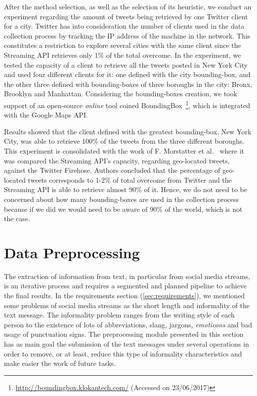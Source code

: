 After the method selection, as well as the selection of its heuristic, we conduct an experiment regarding the amount of tweets being retrieved by one Twitter client for a city. Twitter has into consideration the number of clients used in the data collection process by tracking the IP address of the machine in the network. This constitutes a restriction to explore several cities with the same client since the Streaming API retrieves only 1\% of the total overcome. In the experiment, we tested the capacity of a client to retrieve all the tweets posted in New York City and used four different clients for it: one defined with the city bounding-box, and the other three defined with bounding-boxes of three boroughs in the city: Bronx, Brooklyn and Manhattan. Considering the bounding-boxes creation, we took support of an open-source \textit{online} tool coined BoundingBox~\footnote{\url{http://boundingbox.klokantech.com/} (Accessed on 23/06/2017)}, which is integrated with the Google Maps API.

Results showed that the client defined with the greatest bounding-box, New York City, was able to retrieve 100\% of the tweets from the three different boroughs. This experiment is consolidated with the work of F. Morstatter et al.~\cite{morstatter2013sample} where it was compared the Streaming API's capacity, regarding geo-located tweets, against the Twitter Firehose. Authors concluded that the percentage of geo-located tweets corresponds to 1-2\% of total overcome from Twitter and the Streaming API is able to retrieve almost 90\% of it. Hence, we do not need to be concerned about how many bounding-boxes are used in the collection process because if we did we would  need to be aware of 90\% of the world, which is not the case.

\section{Data Preprocessing}\label{sec:data_preprocessing}
The extraction of information from text, in particular from social media streams, is an iterative process and requires a segmented and planned pipeline to achieve the final results. In the requirements section (\ref{sec:requirements}), we mentioned some problems of social media streams as the short length and informality of the text message. The informality problem ranges from the writing style of each person to the existence of lots of abbreviations, slang, jargons, \textit{emoticons} and bad usage of punctuation signs. The preprocessing module presented in this section has as main goal the submission of the text messages under several operations in order to remove, or at least, reduce this type of informality characteristics and make easier the work of future tasks.

